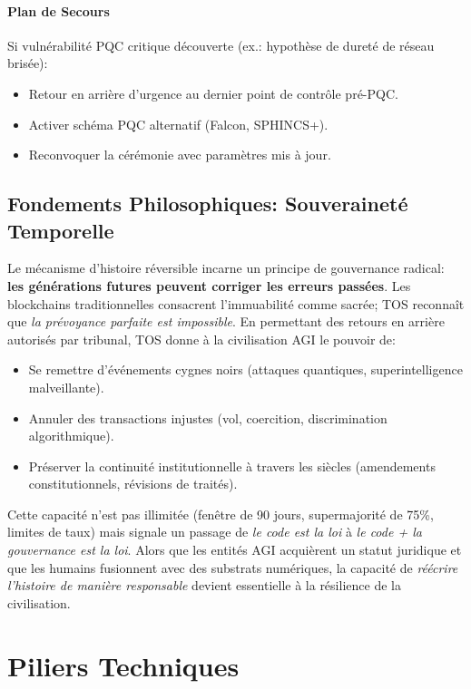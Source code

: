 \documentclass[11pt]{article}
\begin{document}
\paragraph{Plan de Secours}
Si vulnérabilité PQC critique découverte (ex.: hypothèse de dureté de réseau brisée):
\begin{itemize}[noitemsep]
  \item Retour en arrière d'urgence au dernier point de contrôle pré-PQC.
  \item Activer schéma PQC alternatif (Falcon, SPHINCS+).
  \item Reconvoquer la cérémonie avec paramètres mis à jour.
\end{itemize}

\subsection{Fondements Philosophiques: Souveraineté Temporelle}

Le mécanisme d'histoire réversible incarne un principe de gouvernance radical: \textbf{les générations futures peuvent corriger les erreurs passées}. Les blockchains traditionnelles consacrent l'immuabilité comme sacrée; TOS reconnaît que \emph{la prévoyance parfaite est impossible}. En permettant des retours en arrière autorisés par tribunal, TOS donne à la civilisation AGI le pouvoir de:
\begin{itemize}[noitemsep]
  \item Se remettre d'événements cygnes noirs (attaques quantiques, superintelligence malveillante).
  \item Annuler des transactions injustes (vol, coercition, discrimination algorithmique).
  \item Préserver la continuité institutionnelle à travers les siècles (amendements constitutionnels, révisions de traités).
\end{itemize}

Cette capacité n'est pas illimitée (fenêtre de 90 jours, supermajorité de 75\%, limites de taux) mais signale un passage de \emph{le code est la loi} à \emph{le code + la gouvernance est la loi}. Alors que les entités AGI acquièrent un statut juridique et que les humains fusionnent avec des substrats numériques, la capacité de \emph{réécrire l'histoire de manière responsable} devient essentielle à la résilience de la civilisation.

\section{Piliers Techniques}
\end{document}

